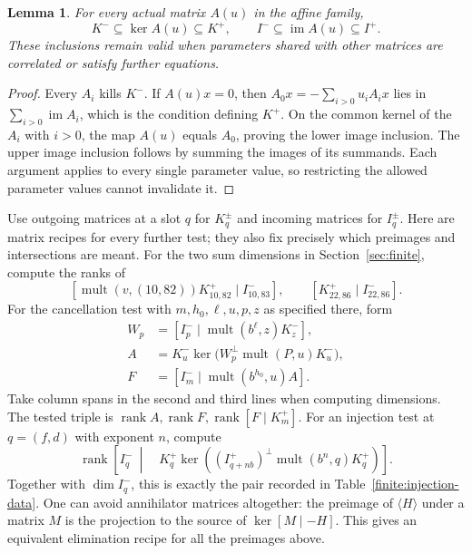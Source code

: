 \documentclass[11pt]{article}
\newtheorem{lemma}[theorem]{Lemma}
\theoremstyle{definition}
\theoremstyle{remark}
\numberwithin{equation}{section}
\begin{document}
\begin{lemma}\label{alg:enclosures-valid}
For every actual matrix $A(u)$ in the affine family,
\[
 K^-\subseteq\ker A(u)\subseteq K^+,
 \qquad I^-\subseteq\operatorname{im} A(u)\subseteq I^+.
\]
These inclusions remain valid when parameters shared with other
matrices are correlated or satisfy further equations.
\end{lemma}

\begin{proof}
Every $A_i$ kills $K^-$.  If $A(u)x=0$, then
$A_0x=-\sum_{i>0}u_iA_ix$ lies in $\sum_{i>0}\operatorname{im} A_i$, which is
the condition defining $K^+$.  On the common kernel of the $A_i$ with
$i>0$, the map $A(u)$ equals $A_0$, proving the lower image inclusion.
The upper image inclusion follows by summing the images of its
summands.  Each argument applies to every single parameter value, so
restricting the allowed parameter values cannot invalidate it.
\end{proof}

Use outgoing matrices at a slot $q$ for $K_q^\pm$ and incoming matrices
for $I_q^\pm$.  Here are matrix recipes for every further test; they
also fix precisely which preimages and intersections are meant.
For the two sum dimensions in Section~\ref{sec:finite}, compute the
ranks of
\[
 [\operatorname{mult}(v,(10,82))K^+_{10,82}\mid I^-_{10,83}],
 \qquad[K^+_{22,86}\mid I^-_{22,86}].
\]
For the cancellation test with $m,h_0,\ell,u,p,z$ as specified there, form
\begin{align}
 W_p&=[I^-_p\mid\operatorname{mult}(b^\ell,z)K^-_z],\label{alg:allowed-space}\\
 A&=K^-_u\ker\bigl(W_p^\perp
                         \operatorname{mult}(P,u)K^-_u\bigr),
                         \label{alg:cancellation-preimage}\\
 F&=[I^-_m\mid\operatorname{mult}(b^{h_0},u)A].
                         \label{alg:cancellation-span}
\end{align}
Take column spans in the second and third lines when computing
dimensions.  The tested triple is
$\operatorname{rank} A,\operatorname{rank} F,\operatorname{rank}[F\mid K^+_m]$.
For an injection test at $q=(f,d)$ with exponent $n$, compute
\begin{equation}\label{alg:injection-test}
 \operatorname{rank}\left[I^-_q\ \middle|\quad
 K^+_q\ker\left((I^+_{q+nb})^\perp
                    \operatorname{mult}(b^n,q)K^+_q\right)\right].
\end{equation}
Together with $\dim I^-_q$, this is exactly the pair recorded in
Table~\ref{finite:injection-data}.  One can avoid annihilator matrices
altogether: the preimage of $\langle H\rangle$ under a matrix $M$ is
the projection to the source of $\ker[M\mid-H]$.  This gives an
equivalent elimination recipe for all the preimages above.
\end{document}
